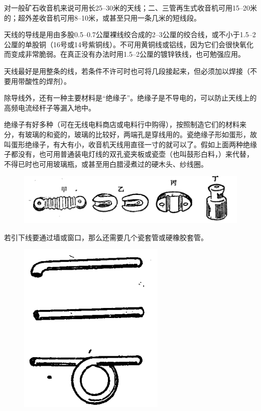 \documentclass[12pt,UTF8]{ctexbook}
\begin{document}
对一般矿石收音机来说可用长25--30米的天线；二、三管再生式收音机可用15--20米的；超外差收音机可用8--10米，或甚至只用一条几米的短线段。

天线的导线是用由多股0.5--0.7公厘裸线绞合成的2--3公厘的绞合线，或不小于1.5--2公厘的单股铜（16号或14号紫铜线）。不可用黄铜线或铝线，因为它们会很快氧化而变成非常脆弱。在真正没有办法时用1.5--2公厘的镀锌铁线，也可勉强应用。

天线最好是用整条的线，若条件不许可时也可将几段接起来，但必须加以焊接（不要用带酸性的焊剂）。

除导线外，还有一种主要材料是“绝缘子”。绝缘子是不导电的，可以防止天线上的高频电流经杆子等漏入地中。

绝缘子有好多种（可在无线电料商店或电料行中购得），按照制造它们的材料来分，有玻璃的和瓷的，玻璃的比较好，两端孔是穿线用的。瓷绝缘子形如蛋形，故叫蛋形绝缘子，有大有小，收音机天线用直径一寸的就可以了。假如上面两种绝缘子都没有，也可用普通装电灯线的双孔瓷夹板或瓷壶（也叫鼓形白料，）来代替，不得已时也可用玻璃瓶，或甚至用白腊浸煮过的硬木头、纱线圈。

\begin{figure}[htbp]
	\centering
	\includegraphics[width=0.7\linewidth]{9}
	\caption{}
	\label{fig:1}
\end{figure}

若引下线要通过墙或窗口，那么还需要几个瓷套管或硬橡胶套管。

\begin{figure}[htbp]
	\centering
	\includegraphics[width=0.7\linewidth]{10}
	\caption{}
	\label{fig:1}
\end{figure}
\end{document}
